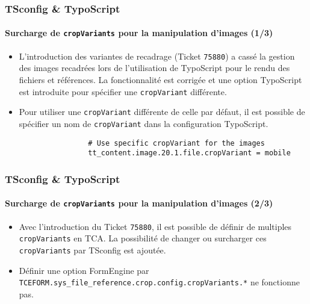 \begin{frame}[fragile]
	\frametitle{TSconfig \& TypoScript}
	\framesubtitle{Surcharge de \texttt{cropVariants} pour la manipulation d'images (1/3)}

	\begin{itemize}
		\item L'introduction des variantes de recadrage (Ticket \texttt{75880}) a cassé la
			gestion des images recadrées lors de l'utilisation de TypoScript pour le rendu des
			fichiers et références. La fonctionnalité est corrigée et une option TypoScript est
			introduite pour spécifier une \texttt{cropVariant} différente.

		\item Pour utiliser une \texttt{cropVariant} différente de celle par défaut, il est
			possible de spécifier un nom de \texttt{cropVariant} dans la configuration TypoScript.

			\begin{lstlisting}
				# Use specific cropVariant for the images
				tt_content.image.20.1.file.cropVariant = mobile
			\end{lstlisting}
	\end{itemize}

\end{frame}



\begin{frame}[fragile]
	\frametitle{TSconfig \& TypoScript}
	\framesubtitle{Surcharge de \texttt{cropVariants} pour la manipulation d'images (2/3)}

	\begin{itemize}
		\item Avec l'introduction du Ticket \texttt{75880}, il est possible de définir de multiples
			\texttt{cropVariants} en TCA. La possibilité de changer ou surcharger ces \texttt{cropVariants}
			par TSconfig est ajoutée.

		\item Définir une option FormEngine par
			\texttt{TCEFORM.sys\_file\_reference.crop.config.cropVariants.*} ne fonctionne pas.

	\end{itemize}

\end{frame}


